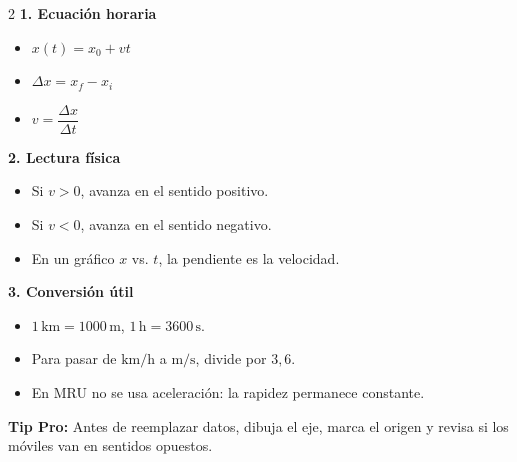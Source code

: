 \documentclass[letterpaper, 12pt]{article}
\newenvironment{kitpropiedades}[1]{\begin{tcolorbox}[colback=celesteSuave, colframe=azulFuerte,title=\textbf{#1}, fonttitle=\bfseries]}{\end{tcolorbox}}
\begin{document}
\begin{kitpropiedades}{RESUMEN DE CLASES: LO QUE DEBES SABER}
\begin{multicols}{2}
\textbf{1. Ecuación horaria}
\begin{itemize}[leftmargin=10pt]
    \item $x(t)=x_0+vt$
    \item $\Delta x=x_f-x_i$
    \item $v=\dfrac{\Delta x}{\Delta t}$
\end{itemize}
\columnbreak
\textbf{2. Lectura física}
\begin{itemize}[leftmargin=10pt]
    \item Si $v>0$, avanza en el sentido positivo.
    \item Si $v<0$, avanza en el sentido negativo.
    \item En un gráfico $x$ vs. $t$, la pendiente es la velocidad.
\end{itemize}
\end{multicols}
\textbf{3. Conversión útil}
\begin{itemize}[leftmargin=10pt, itemsep=0.1cm]
    \item $1\,\mathrm{km}=1000\,\mathrm{m}$, \quad $1\,\mathrm{h}=3600\,\mathrm{s}$.
    \item Para pasar de $\mathrm{km/h}$ a $\mathrm{m/s}$, divide por $3{,}6$.
    \item En MRU no se usa aceleración: la rapidez permanece constante.
\end{itemize}
\begin{center}\small\textbf{Tip Pro:} Antes de reemplazar datos, dibuja el eje, marca el origen y revisa si los móviles van en sentidos opuestos.\end{center}
\end{kitpropiedades}
\end{document}
